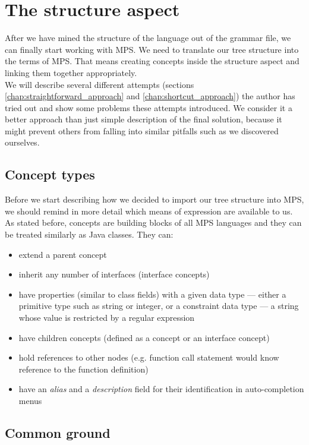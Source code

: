 \section{The structure aspect}

After we have mined the structure of the language out of the grammar file, we can finally start working with MPS.
We need to translate our tree structure into the terms of MPS.
That means creating concepts inside the structure aspect and linking them together appropriately.
\\

We will describe several different attempts (sections \ref{chap:straightforward_approach} and \ref{chap:shortcut_approach}) the author has tried out and show some problems these attempts introduced.
We consider it a better approach than just simple description of the final solution, because it might prevent others from falling into similar pitfalls such as we discovered ourselves.


\subsection{Concept types}

Before we start describing how we decided to import our tree structure into MPS, we should remind in more detail which means of expression are available to us.
As stated before, concepts are building blocks of all MPS languages and they can be treated similarly as Java classes.
They can:

\begin{itemize}
	\item extend a parent concept
	\item inherit any number of interfaces (interface concepts)
	\item have properties (similar to class fields) with a given data type --- either a primitive type such as string or integer, or a constraint data type --- a string whose value is restricted by a regular expression
	\item have children concepts (defined as a concept or an interface concept)
	\item hold references to other nodes (e.g. function call statement would know reference to the function definition)
	\item have an \textit{alias} and a \textit{description} field for their identification in auto-completion menus
\end{itemize}

\subsection{Common ground}
\label{chap:common_ground}

